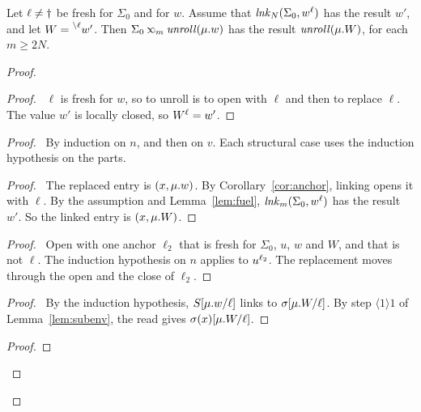 \begin{lem}[Unrolling]\label{lem:unroll}
  Let $\ell\neq\dead$ be fresh for $\Sigma_0$ and for $w$.
  Assume that $\lnkv{N}(\Sigma_0,\openloc{\ell}{w})$ has the result $w'$, and let $W=\closeloc{\ell}{w'}$.
  Then $\Sigma_0\lk{m}\unroll(\muval{w})$ has the result $\unroll(\muval{W})$, for each $m\ge 2N$.
\end{lem}
\begin{proof}
  \begin{proof}
    \pf\ $\ell$ is fresh for $w$, so to unroll is to open with $\ell$ and then to replace $\ell$.
    The value $w'$ is locally closed, so $\openloc{\ell}{W}=w'$.
  \end{proof}
  \begin{proof}
    \pfsketch\ By induction on $n$, and then on $v$.
    Each structural case uses the induction hypothesis on the parts.
    \begin{proof}
      \pf\ The replaced entry is $(x,\muval{w})$.
      By Corollary~\ref{cor:anchor}, linking opens it with $\ell$.
      By the assumption and Lemma~\ref{lem:fuel}, $\lnkv{m}(\Sigma_0,\openloc{\ell}{w})$ has the result $w'$.
      So the linked entry is $(x,\muval{W})$.
    \end{proof}
    \begin{proof}
      \pf\ Open with one anchor $\ell_2$ that is fresh for $\Sigma_0$, $u$, $w$ and $W$, and that is not $\ell$.
      The induction hypothesis on $n$ applies to $\openloc{\ell_2}{u}$.
      The replacement moves through the open and the close of $\ell_2$.
    \end{proof}
    \begin{proof}
      \pf\ By the induction hypothesis, $\repl{S}{w}{\ell}$ links to $\repl{\sigma}{W}{\ell}$.
      By step $\langle1\rangle1$ of Lemma~\ref{lem:subenv}, the read gives $\repl{\sigma(x)}{W}{\ell}$.
    \end{proof}
    \begin{proof}

\end{proof}
\end{proof}
\end{proof}
